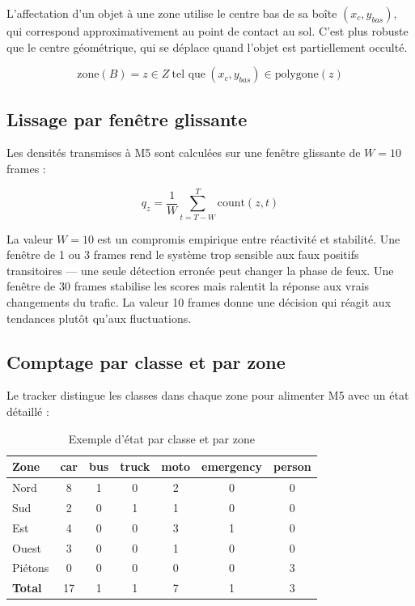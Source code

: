 L'affectation d'un objet à une zone
utilise le centre bas de sa boîte
$(x_c, y_{bas})$, qui correspond
approximativement au point de contact
au sol. C'est plus robuste que le centre
géométrique, qui se déplace quand
l'objet est partiellement occulté.

\begin{equation}
\text{zone}(B) = z \in Z\
\text{tel que}\
(x_c, y_{bas}) \in \text{polygone}(z)
\label{eq:zone_assign}
\end{equation}

\subsection{Lissage par fenêtre glissante}

Les densités transmises à M5 sont
calculées sur une fenêtre glissante
de $W = 10$ frames :

\begin{equation}
q_z = \frac{1}{W}
\sum_{t=T-W}^{T} \text{count}(z, t)
\label{eq:density}
\end{equation}

La valeur $W = 10$ est un compromis
empirique entre réactivité et stabilité.
Une fenêtre de 1 ou 3 frames rend le
système trop sensible aux faux positifs
transitoires — une seule détection
erronée peut changer la phase de feux.
Une fenêtre de 30 frames stabilise les
scores mais ralentit la réponse aux
vrais changements du trafic. La valeur
10 frames donne une décision qui réagit
aux tendances plutôt qu'aux fluctuations.

\subsection{Comptage par classe et par zone}

Le tracker distingue les classes dans
chaque zone pour alimenter M5 avec
un état détaillé :

\begin{table}[H]
\centering
\caption{Exemple d'état par classe et par zone}
\begin{tabularx}{\textwidth}{lcccccc}
\toprule
\textbf{Zone} &
\textbf{car} & \textbf{bus} &
\textbf{truck} & \textbf{moto} &
\textbf{emergency} & \textbf{person} \\
\midrule
Nord    & 8 & 1 & 0 & 2 & 0 & 0 \\
Sud     & 2 & 0 & 1 & 1 & 0 & 0 \\
Est     & 4 & 0 & 0 & 3 & 1 & 0 \\
Ouest   & 3 & 0 & 0 & 1 & 0 & 0 \\
Piétons & 0 & 0 & 0 & 0 & 0 & 3 \\
\midrule
\textbf{Total} &
17 & 1 & 1 & 7 & 1 & 3 \\
\bottomrule
\end{tabularx}
\label{tab:zone_counts}
\end{table}

